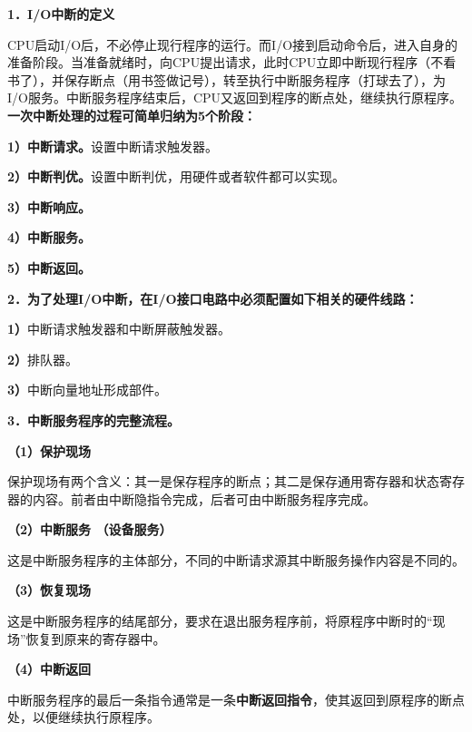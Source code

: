 {\textbf{1．I/O中断的定义}}

CPU启动I/O后，不必停止现行程序的运行。而I/O接到启动命令后，进入自身的准备阶段。当准备就绪时，向CPU提出请求，此时CPU立即中断现行程序（不看书了），并保存断点（用书签做记号），转至执行中断服务程序（打球去了），为I/O服务。中断服务程序结束后，CPU又返回到程序的断点处，继续执行原程序。\\
\textbf{一次中断处理的过程可简单归纳为5个阶段：}

\textbf{1）中断请求。}设置中断请求触发器。

\textbf{2）中断判优。}设置中断判优，用硬件或者软件都可以实现。

\textbf{3）中断响应。}

\textbf{4）中断服务。}

\textbf{5）中断返回。}

{\textbf{2．}}{\textbf{为了处理I/O中断，在I/O接口电路中必须配置如下相关的硬件线路：}}

\textbf{1）}中断请求触发器和中断屏蔽触发器。

\textbf{2）}排队器。

\textbf{3）}中断向量地址形成部件。

{\textbf{3．}}{\textbf{中断服务程序的完整流程。}}

\textbf{（1）保护现场}

保护现场有两个含义：其一是{保存程序的断点}；其二是{保存通用寄存器和状态寄存器的内容}。前者由中断隐指令完成，后者可由中断服务程序完成。

\textbf{（2）中断服务 （设备服务）}

这是中断服务程序的主体部分，不同的中断请求源其中断服务操作内容是不同的。

\textbf{（3）恢复现场}

这是中断服务程序的结尾部分，要求在退出服务程序前，将原程序中断时的``现场''恢复到原来的寄存器中。

\textbf{（4）中断返回}

中断服务程序的最后一条指令通常是一条\textbf{中断返回指令}，使其返回到原程序的断点处，以便继续执行原程序。\\
